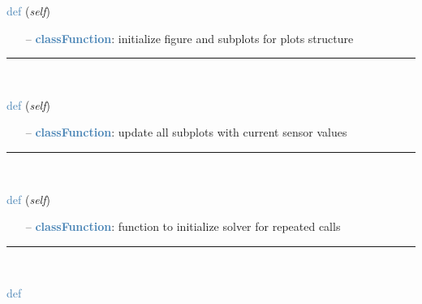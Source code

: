 \begin{itemize}[leftmargin=1.4cm]
\begin{itemize}[leftmargin=1.4cm]
\begin{itemize}[leftmargin=0.5cm]
\begin{itemize}[leftmargin=1.4cm]
\begin{itemize}[leftmargin=1.4cm]
\begin{itemize}[leftmargin=0.5cm]
\begin{itemize}[leftmargin=1.4cm]
\begin{itemize}[leftmargin=0.5cm]
\begin{itemize}[leftmargin=1.4cm]
\begin{itemize}[leftmargin=1.4cm]
\begin{flushleft}
\noindent \textcolor{steelblue}{def {\bf {}}}\label{sec:interactive:InteractiveDialog:InitializePlots}
({\it self})
\end{flushleft}
\setlength{\itemindent}{0.7cm}
\begin{itemize}[leftmargin=0.7cm]
  \item[--]  \textcolor{steelblue}{\bf classFunction}: initialize figure and subplots for plots structure\vspace{12pt}\end{itemize}
%
\noindent\rule{8cm}{0.75pt}\vspace{1pt} \\ 
\begin{flushleft}
\noindent \textcolor{steelblue}{def {\bf {}}}\label{sec:interactive:InteractiveDialog:UpdatePlots}
({\it self})
\end{flushleft}
\setlength{\itemindent}{0.7cm}
\begin{itemize}[leftmargin=0.7cm]
  \item[--]  \textcolor{steelblue}{\bf classFunction}: update all subplots with current sensor values\vspace{12pt}\end{itemize}
%
\noindent\rule{8cm}{0.75pt}\vspace{1pt} \\ 
\begin{flushleft}
\noindent \textcolor{steelblue}{def {\bf {}}}\label{sec:interactive:InteractiveDialog:InitializeSolver}
({\it self})
\end{flushleft}
\setlength{\itemindent}{0.7cm}
\begin{itemize}[leftmargin=0.7cm]
  \item[--]  \textcolor{steelblue}{\bf classFunction}: function to initialize solver for repeated calls\vspace{12pt}\end{itemize}
%
\noindent\rule{8cm}{0.75pt}\vspace{1pt} \\ 
\begin{flushleft}
\noindent \textcolor{steelblue}{def {\bf {}}}\label{sec:interactive:InteractiveDialog:FinalizeSolver}

\end{flushleft}
\end{itemize}
\end{itemize}
\end{itemize}
\end{itemize}
\end{itemize}
\end{itemize}
\end{itemize}
\end{itemize}
\end{itemize}
\end{itemize}
